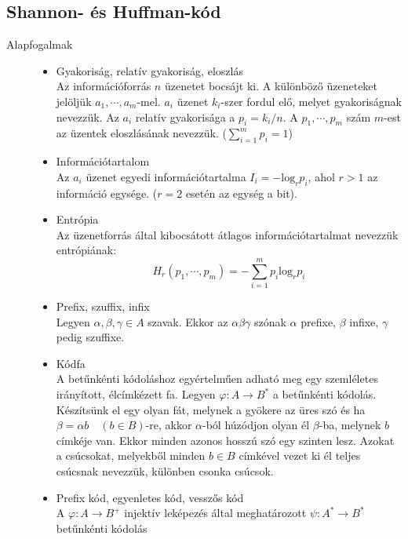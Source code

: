 \documentclass[margin=0px]{article}
\begin{document}
\subsection{Shannon- és Huffman-kód}
\begin{description}
    \item[Alapfogalmak] \hfill
        \begin{itemize}
            \item Gyakoriság, relatív gyakoriság, eloszlás \\
                  Az információforrás $n$ üzenetet bocsájt ki. A különböző üzeneteket jelöljük $a_1, \cdots, a_m$-mel. $a_i$ üzenet $k_i$-szer fordul elő, melyet gyakoriságnak nevezzük. Az $a_i$ relatív gyakorisága a $p_i = k_i/n$. A $p_1,\cdots,p_m$ szám $m$-est az üzentek eloszlásának nevezzük. ($\sum_{i=1}^{m}p_i = 1$)
            \item Információtartalom \\
                  Az $a_i$ üzenet egyedi információtartalma $I_i = - \text{log}_rp_i$, ahol $r>1$ az információ egysége. ($r=2$ esetén az egység a bit).
            \item Entrópia \\
                  Az üzenetforrás által kibocsátott átlagos információtartalmat nevezzük entrópiának:
                  \[H_r(p_1, \cdots, p_m) = - \sum\limits_{i=1}^{m}p_i\text{log}_rp_i  \]
            \item Prefix, szuffix, infix \\
                  Legyen $\alpha, \beta, \gamma \in A$ szavak. Ekkor az $\alpha\beta\gamma$ szónak $\alpha$ prefixe, $\beta$ infixe, $\gamma$ pedig szuffixe.
            \item Kódfa \\
                  A betűnkénti kódoláshoz egyértelműen adható meg egy szemléletes irányított, élcímkézett fa. Legyen $\varphi : A \rightarrow B^*$ a betűnkénti kódolás. Készítsünk el egy olyan fát, melynek a gyökere az üres szó és ha $\beta = \alpha b\quad (b\in B)$-re, akkor $\alpha$-ból húzódjon olyan él $\beta$-ba, melynek $b$ címkéje van. Ekkor minden azonos hosszú szó egy szinten lesz. Azokat a csúcsokat, melyekből minden $b\in B$ címkével vezet ki él teljes csúcsnak nevezzük, különben csonka csúcsok.
            \item Prefix kód, egyenletes kód, vesszős kód \\
                  A $\varphi : A \rightarrow B^+$ injektív leképezés által meghatározott $\psi : A^* \rightarrow B^*$ betűnkénti kódolás

\end{itemize}
\end{description}
\end{document}
